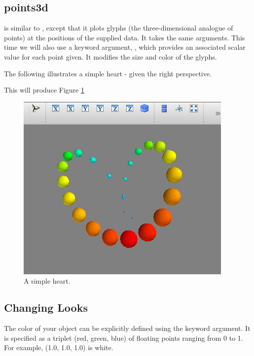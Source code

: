 \subsection*{points3d}
 is similar to , except that it plots glyphs (the three-dimensional analogue of points) at the 
positions of the supplied data. It takes the same arguments. This time we 
will also use a keyword argument, , which provides an associated scalar 
value for each point given. It modifies the size and color of the glyphs. 

The following illustrates a simple heart - given the right perspective. 



This will produce Figure \ref{mayavi:points3d.pdf}

\begin{figure} 
\includegraphics[width=\textwidth]{points3d.pdf}
\caption{A simple heart. } 
\label{mayavi:points3d.pdf}
\end{figure}

\subsection*{Changing Looks}
The color of your object can be explicitly defined using the  
keyword argument. It is specified as a triplet (red, green, blue) of 
floating points ranging from 0 to 1. 
For example, (1.0, 1.0, 1.0) is white. 

